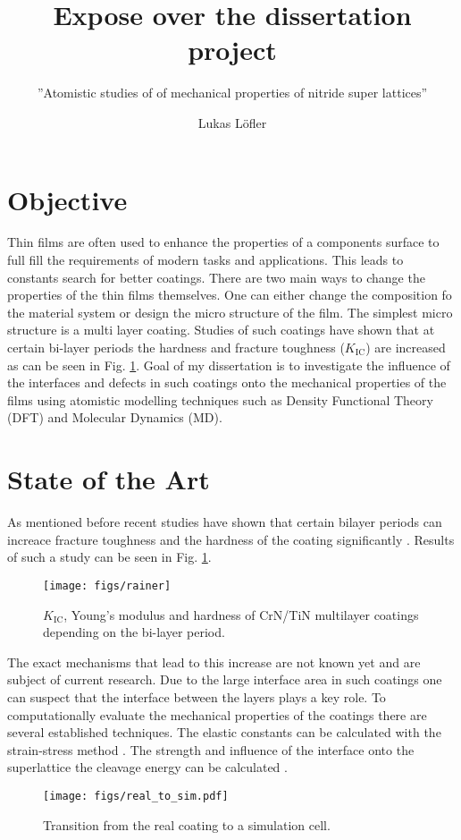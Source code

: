 \documentclass[12pt]{scrartcl}
\begin{document}
\author{Lukas Löfler}
\title{Expose over the dissertation project}
\subtitle{ ''Atomistic studies of of mechanical properties of nitride super lattices''}

\maketitle
\section{Objective}
Thin films are often used to enhance the properties of a components surface to full fill the requirements of modern tasks and applications. This leads to constants search for better coatings. There are two main ways to change the properties of the thin films themselves. One can either change the composition fo the material system or design the micro structure of the film. The simplest micro structure is a multi layer coating. Studies of such coatings have shown that at certain bi-layer periods the hardness and fracture toughness ($K_\mathrm{IC}$) are increased as can be seen in Fig. \ref{Rainer_fig}. Goal of my dissertation is to investigate the influence of the interfaces and defects in such coatings onto the mechanical properties of the films using atomistic modelling techniques such as Density Functional Theory (DFT) and Molecular Dynamics (MD).\medskip


\section{State of the Art}

As mentioned before recent studies have shown that certain bilayer periods can increace fracture toughness and the hardness of the coating significantly \cite{Hahn2016}. Results of such a study can be seen in Fig. \ref{Rainer_fig}.   
\begin{figure}[h]
	\centering
	\texttt{[image: figs/rainer]}
	\caption{$K_ \mathrm{IC}$, Young's modulus and hardness of CrN/TiN multilayer coatings depending on the bi-layer period\cite{Hahn2016}.}
	\label{Rainer_fig}
\end{figure}

The exact mechanisms that lead to this increase are not known yet and are subject of current research. Due to the large interface area in such coatings one can suspect that the interface between the layers plays a key role. To computationally evaluate the mechanical properties of the coatings there are several established techniques. The elastic constants can be calculated with the strain-stress method \cite{Yu2010}. The strength and influence of the interface onto the superlattice the cleavage energy can be calculated \cite{Rehak2017}.   
\begin{figure}[h]
	\centering
	\texttt{[image: figs/real\_to\_sim.pdf]}
	\caption{Transition from the real coating to a simulation cell.}
\end{figure}	
\end{document}
